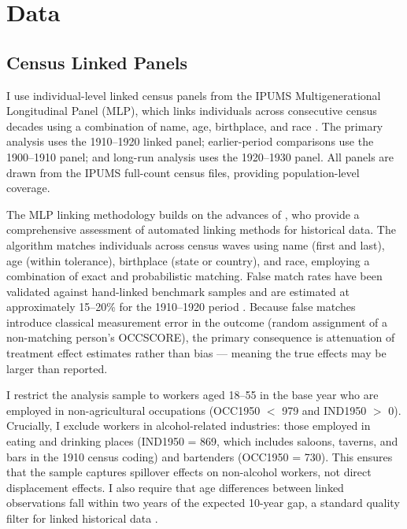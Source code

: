 \documentclass[12pt]{article}
\begin{document}
\section{Data}
\label{sec:data}

\subsection{Census Linked Panels}

I use individual-level linked census panels from the IPUMS Multigenerational Longitudinal Panel (MLP), which links individuals across consecutive census decades using a combination of name, age, birthplace, and race \citep{ruggles2021, abramitzky2021}. The primary analysis uses the 1910--1920 linked panel; earlier-period comparisons use the 1900--1910 panel; and long-run analysis uses the 1920--1930 panel. All panels are drawn from the IPUMS full-count census files, providing population-level coverage.

The MLP linking methodology builds on the advances of \citet{abramitzky2021}, who provide a comprehensive assessment of automated linking methods for historical data. The algorithm matches individuals across census waves using name (first and last), age (within tolerance), birthplace (state or country), and race, employing a combination of exact and probabilistic matching. False match rates have been validated against hand-linked benchmark samples and are estimated at approximately 15--20\% for the 1910--1920 period \citep{feigenbaum2018}. Because false matches introduce classical measurement error in the outcome (random assignment of a non-matching person's OCCSCORE), the primary consequence is attenuation of treatment effect estimates rather than bias --- meaning the true effects may be larger than reported.

I restrict the analysis sample to workers aged 18--55 in the base year who are employed in non-agricultural occupations (OCC1950 $<$ 979 and IND1950 $>$ 0). Crucially, I exclude workers in alcohol-related industries: those employed in eating and drinking places (IND1950 = 869, which includes saloons, taverns, and bars in the 1910 census coding) and bartenders (OCC1950 = 730). This ensures that the sample captures spillover effects on non-alcohol workers, not direct displacement effects. I also require that age differences between linked observations fall within two years of the expected 10-year gap, a standard quality filter for linked historical data \citep{feigenbaum2018}.
\end{document}
